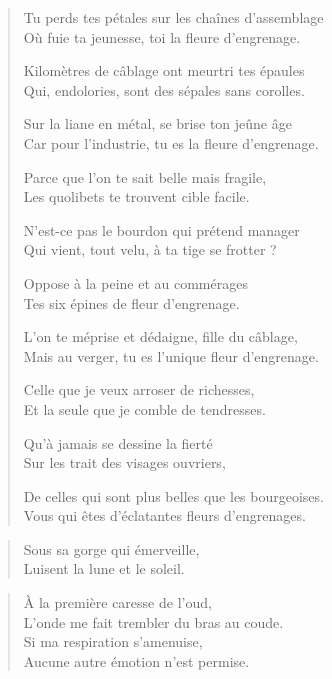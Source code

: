 \begin{verse}
Tu perds tes pétales sur les chaînes d’assemblage\\
Où fuie ta jeunesse, toi la fleure d’engrenage.

Kilomètres de câblage ont meurtri tes épaules\\
Qui, endolories,  sont des sépales sans corolles.

Sur la liane en métal, se brise ton jeûne âge\\
Car pour l’industrie, tu es la fleure d’engrenage.

Parce que l’on te sait belle mais fragile,\\
Les quolibets te trouvent cible facile.

N’est-ce pas le bourdon qui prétend manager\\
Qui vient, tout velu, à ta tige se frotter ?

Oppose à la peine et au commérages\\
Tes six épines de fleur d’engrenage.

L’on te méprise et dédaigne, fille du câblage,\\
Mais au verger, tu es l’unique fleur d’engrenage.

Celle que je veux arroser de richesses,\\
Et la seule que je comble de tendresses.

Qu’à jamais se dessine la fierté\\
Sur les trait des visages ouvriers,

De celles qui sont plus belles que les bourgeoises.\\
Vous qui êtes d’éclatantes fleurs d’engrenages.
\end{verse}


\begin{verse}
Sous sa gorge qui émerveille,\\
Luisent la lune et le soleil.
\end{verse}

\begin{verse}
À la première caresse de l’oud,\\
L’onde me fait trembler du bras au coude.\\
Si ma respiration s’amenuise,\\
Aucune autre émotion n’est permise.
\end{verse}

